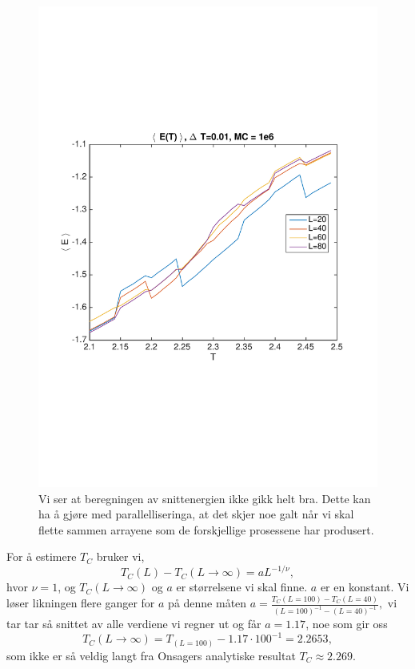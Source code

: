 \documentclass[norsk, 10pt]{article}
\begin{document}
\begin{figure}[H]
	\centering
	\includegraphics[scale = 0.5, trim = 1cm 8cm 1cm 8cm]{avgenergyLOL.pdf}
	\caption{Vi ser at beregningen av snittenergien ikke gikk helt bra. Dette kan ha å gjøre med parallelliseringa, at det skjer noe galt når vi skal flette sammen arrayene som de forskjellige prosessene har produsert.}
	\label{fig:avgenergyLOL}
\end{figure}
For å estimere $T_C$ bruker vi,
$$ T_C(L) - T_C(L\to\infty) = aL^{-1/\nu}, $$
hvor $\nu=1$, og $T_C(L\to\infty)$ og $a$ er størrelsene vi skal finne. $a$ er en konstant. Vi løser likningen flere ganger for $a$ på denne måten
$ a = \frac{T_C(L=100) - T_C(L=40)}{(L=100)^{-1} - (L=40)^{-1}}, $
vi tar tar så snittet av alle verdiene vi regner ut og får
$a=1.17$, noe som gir oss
$$ T_C(L\to\infty) = T_(L=100) - 1.17\cdot100^{-1} = 2.2653, $$
som ikke er så veldig langt fra Onsagers analytiske resultat $T_C \approx 2.269$.
\end{document}
